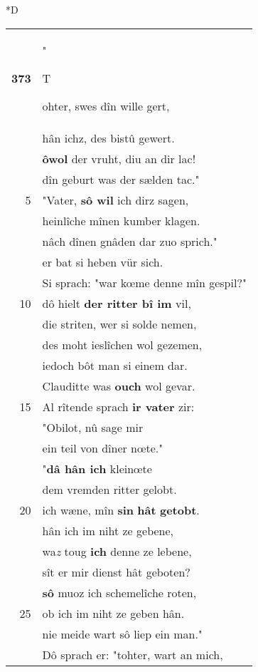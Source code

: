 \documentclass[8pt,a4paper,notitlepage]{article}
\begin{document}
\begin{table}[ht]
\begin{minipage}[t]{0.5\linewidth}
\small
\begin{center}*D
\end{center}
\begin{tabular}{rl}
\textbf{373} & "\begin{large}T\end{large}ohter, swes dîn wille gert,\\ 
 & hân ichz, des bistû gewert.\\ 
 & \textbf{ôwol} der vruht, diu an dir lac!\\ 
 & dîn geburt was der sælden tac."\\ 
5 & "Vater, \textbf{sô wil} ich dirz sagen,\\ 
 & heinlîche mînen kumber klagen.\\ 
 & nâch dînen gnâden dar zuo sprich."\\ 
 & er bat si heben vür sich.\\ 
 & Si sprach: "war kœme denne mîn gespil?"\\ 
10 & dô hielt \textbf{der ritter bî im} vil,\\ 
 & die striten, wer si solde nemen,\\ 
 & des moht ieslîchen wol gezemen,\\ 
 & iedoch bôt man si einem dar.\\ 
 & Clauditte was \textbf{ouch} wol gevar.\\ 
15 & Al rîtende sprach \textbf{ir vater} zir:\\ 
 & "Obilot, nû sage mir\\ 
 & ein teil von dîner nœte."\\ 
 & "\textbf{dâ hân ich} kleinœte\\ 
 & dem vremden ritter gelobt.\\ 
20 & ich wæne, mîn \textbf{sin} \textbf{hât} \textbf{getobt}.\\ 
 & hân ich im niht ze gebene,\\ 
 & wa\textit{z} toug \textbf{ich} denne ze lebene,\\ 
 & sît er mir dienst hât geboten?\\ 
 & \textbf{sô} muoz ich schemelîche roten,\\ 
25 & ob ich im niht ze geben hân.\\ 
 & nie meide wart sô liep ein man."\\ 
 & Dô sprach er: "tohter, wart an mich,\\ 

\end{tabular}
\end{minipage}
\end{table}
\end{document}
